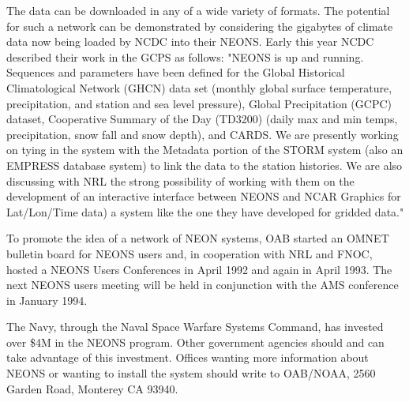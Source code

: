	The data can be downloaded in any of a wide variety of formats.  The 
potential for such a network can be demonstrated by considering the 
gigabytes of climate data now being loaded by NCDC into their NEONS.  
Early this year NCDC described their work in the GCPS as follows:  "NEONS 
is up and running.  Sequences and parameters have been defined for the 
Global Historical Climatological Network (GHCN) data set (monthly global 
surface temperature, precipitation, and station and sea level pressure), 
Global Precipitation (GCPC) dataset, Cooperative Summary of the Day 
(TD3200) (daily max and min temps, precipitation, snow fall and snow 
depth), and CARDS.  We are presently working on tying in the system with 
the Metadata portion of the STORM system (also an EMPRESS database 
system) to link the data to the station histories. We are also discussing 
with NRL the strong possibility of working with them on the development 
of an interactive interface between NEONS and NCAR Graphics for 
Lat/Lon/Time data) a system like the one they have developed for gridded 
data."

	To promote the idea of a network of NEON systems, OAB started an 
OMNET bulletin board for NEONS users and, in cooperation with NRL and 
FNOC, hosted a NEONS Users Conferences in April 1992 and again in April 
1993.  The next NEONS users meeting will be held in conjunction with the 
AMS conference in January 1994.

\bigskip
{}
\bigskip

	The Navy, through the Naval Space Warfare Systems Command, has 
invested over \$4M in the NEONS program.  Other government agencies 
should and can take advantage of this investment.  Offices wanting more 
information about NEONS or wanting to install the system should write to 
OAB/NOAA, 2560 Garden Road, Monterey CA 93940.
\newpage


